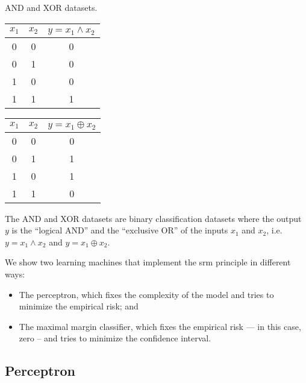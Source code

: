 \begin{tablebox}[label=tab:and-xor]{AND and XOR datasets.}
  \centering
  \begin{minipage}{0.45\textwidth}
    \centering
    \begin{tabular}{ccc}
      \toprule
      $x_1$ & $x_2$ & $y = x_1 \land x_2$ \\
      \midrule
      0 & 0 & 0 \\
      0 & 1 & 0 \\
      1 & 0 & 0 \\
      1 & 1 & 1 \\
      \bottomrule
    \end{tabular}
  \end{minipage}
  \begin{minipage}{0.45\textwidth}
  \centering
  \begin{tabular}{ccc}
    \toprule
    $x_1$ & $x_2$ & $y = x_1 \oplus x_2$ \\
    \midrule
    0 & 0 & 0 \\
    0 & 1 & 1 \\
    1 & 0 & 1 \\
    1 & 1 & 0 \\
    \bottomrule
  \end{tabular}
  \end{minipage}
  \tcblower
  The AND and XOR datasets are binary classification datasets where the output $y$ is the
  ``logical AND'' and the ``exclusive OR'' of the inputs $x_1$ and $x_2$, i.e.
  $y = x_1 \land x_2$ and $y = x_1 \oplus x_2$.
\end{tablebox}

We show two learning machines that implement the \gls{srm} principle in different ways:
\begin{itemize}
  \itemsep0em
  \item The perceptron, which fixes the complexity of the model and tries to minimize the
    empirical risk; and
  \item The maximal margin classifier, which fixes the empirical risk --- in this case,
    zero -- and tries to minimize the confidence interval.
\end{itemize}

\subsection{Perceptron}
\label{sub:perceptron}

